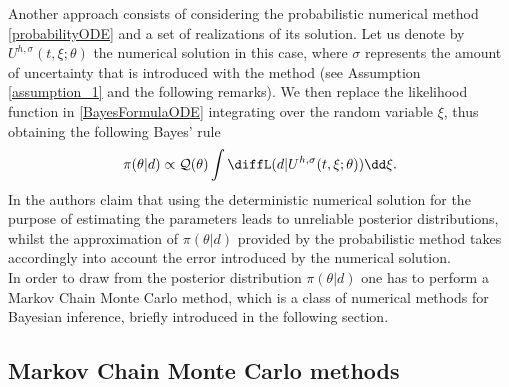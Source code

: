  Another approach consists of considering the probabilistic numerical method \eqref{probabilityODE} and a set of realizations of its solution. Let us denote by $U^{h, \sigma}(t, \xi; \theta)$ the numerical solution in this case, where $\sigma$ represents the amount of uncertainty that is introduced with the method (see Assumption \ref{assumption_1} and the following remarks). We then replace the likelihood function in \eqref{BayesFormulaODE} integrating over the random variable $\xi$, thus obtaining the following Bayes' rule
 \begin{equation}
	 	\pi(\theta|d) \propto \mathcal{Q}(\theta) \int{\diffL(d|U^{h,\sigma}(t,\xi;\theta))\dd\xi}.
 \end{equation}
 In \cite{CGS16} the authors claim that using the deterministic numerical solution for the purpose of estimating the parameters leads to unreliable posterior distributions, whilst the approximation of $\pi(\theta|d)$ provided by the probabilistic method takes accordingly into account the error introduced by the numerical solution. \\
 In order to draw from the posterior distribution $\pi(\theta|d)$ one has to perform a Markov Chain Monte Carlo method, which is a class of numerical methods for Bayesian inference, briefly introduced in the following section.
 
\subsection{Markov Chain Monte Carlo methods}

